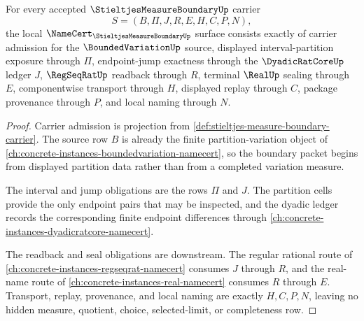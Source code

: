 \begin{theorem}
\label{thm:stieltjes-measure-boundary-namecert-obligations}
For every accepted $\StieltjesMeasureBoundaryUp$ carrier
$$
S=(B,\Pi,J,R,E,H,C,P,N),
$$
the local $\NameCert_{\StieltjesMeasureBoundaryUp}$ surface consists exactly of carrier admission for the $\BoundedVariationUp$ source, displayed interval-partition exposure through $\Pi$, endpoint-jump exactness through the $\DyadicRatCoreUp$ ledger $J$, $\RegSeqRatUp$ readback through $R$, terminal $\RealUp$ sealing through $E$, componentwise transport through $H$, displayed replay through $C$, package provenance through $P$, and local naming through $N$.
\end{theorem}
\begin{proof}
Carrier admission is projection from \autoref{def:stieltjes-measure-boundary-carrier}. The source row $B$ is already the finite partition-variation object of \autoref{ch:concrete-instances-boundedvariation-namecert}, so the boundary packet begins from displayed partition data rather than from a completed variation measure.

The interval and jump obligations are the rows $\Pi$ and $J$. The partition cells provide the only endpoint pairs that may be inspected, and the dyadic ledger records the corresponding finite endpoint differences through \autoref{ch:concrete-instances-dyadicratcore-namecert}.

The readback and seal obligations are downstream. The regular rational route of \autoref{ch:concrete-instances-regseqrat-namecert} consumes $J$ through $R$, and the real-name route of \autoref{ch:concrete-instances-real-namecert} consumes $R$ through $E$. Transport, replay, provenance, and local naming are exactly $H,C,P,N$, leaving no hidden measure, quotient, choice, selected-limit, or completeness row.
\end{proof}

